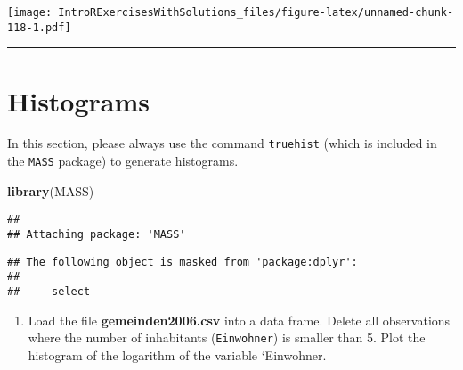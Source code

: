 \documentclass[]{article}
\newenvironment{Shaded}{\begin{snugshade}}{\end{snugshade}}
\newcommand{\KeywordTok}[1]{\textcolor[rgb]{0.13,0.29,0.53}{\textbf{#1}}}
\newcommand{\DataTypeTok}[1]{\textcolor[rgb]{0.13,0.29,0.53}{#1}}
\newcommand{\DecValTok}[1]{\textcolor[rgb]{0.00,0.00,0.81}{#1}}
\newcommand{\StringTok}[1]{\textcolor[rgb]{0.31,0.60,0.02}{#1}}
\newcommand{\CommentTok}[1]{\textcolor[rgb]{0.56,0.35,0.01}{\textit{#1}}}
\newcommand{\OperatorTok}[1]{\textcolor[rgb]{0.81,0.36,0.00}{\textbf{#1}}}
\newcommand{\NormalTok}[1]{#1}
\providecommand{\tightlist}{%
  \setlength{\itemsep}{0pt}\setlength{\parskip}{0pt}}
\begin{document}
\texttt{[image: IntroRExercisesWithSolutions\_files/figure-latex/unnamed-chunk-118-1.pdf]}

\begin{center}\rule{0.5\linewidth}{\linethickness}\end{center}

\section{Histograms}\label{histograms}

In this section, please always use the command \texttt{truehist} (which
is included in the \texttt{MASS} package) to generate histograms.

\begin{Shaded}
\begin{Highlighting}[]
\KeywordTok{library}\NormalTok{(MASS)}
\end{Highlighting}
\end{Shaded}

\begin{verbatim}
## 
## Attaching package: 'MASS'
\end{verbatim}

\begin{verbatim}
## The following object is masked from 'package:dplyr':
## 
##     select
\end{verbatim}

\begin{enumerate}
\def\labelenumi{\arabic{enumi}.}
\tightlist
\item
  Load the file \textbf{gemeinden2006.csv} into a data frame. Delete all
  observations where the number of inhabitants (\texttt{Einwohner}) is
  smaller than 5. Plot the histogram of the logarithm of the variable
  `Einwohner.
\end{enumerate}

\begin{Shaded}
\end{Shaded}
\end{document}
